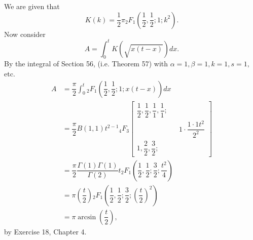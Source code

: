 \begin{solution}
We are given that
$$K(k) = \dfrac{1}{2} \pi {}_2F_1 \left( \dfrac{1}{2}, \dfrac{1}{2}; 1; k^2 \right).$$
Now consider
$$A = \displaystyle\int_0^t K(\sqrt{x(t-x)}) dx.$$
By the integral of Section 56, (i.e. Theorem 57) with $\alpha=1, \beta=1, k=1, s=1,$ etc.
$$\begin{array}{rl}
A &= \dfrac{\pi}{2} \displaystyle\int_0^t {}_2F_1 \left( \dfrac{1}{2}, \dfrac{1}{2}; 1; x(t-x) \right) dx \\
&= \dfrac{\pi}{2} B(1,1) t^{2-1} {}_4F_3 \left[ \begin{array}{rlr}
\dfrac{1}{2}, \dfrac{1}{2}, \dfrac{1}{1}, \dfrac{1}{1}; & & \\
& & 1 \cdot \dfrac{1 \cdot 1 t^2}{2^2} \\
1, \dfrac{2}{2}, \dfrac{3}{2}; & &
\end{array} \right] \\
&= \dfrac{\pi}{2} \dfrac{\Gamma(1) \Gamma(1)}{\Gamma(2)} t {}_2F_1 \left( \dfrac{1}{2}, \dfrac{1}{2}; \dfrac{3}{2}; \dfrac{t^2}{4} \right) \\
&= \pi \left( \dfrac{t}{2} \right) {}_2F_1 \left( \dfrac{1}{2}, \dfrac{1}{2}; \dfrac{3}{2}; \left( \dfrac{t}{2} \right)^2 \right) \\
&= \pi \arcsin \left( \dfrac{t}{2} \right),
\end{array}$$
by Exercise 18, Chapter 4.
\end{solution}